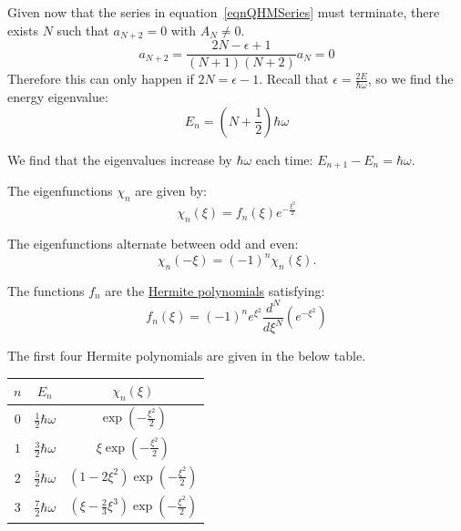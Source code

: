 \documentclass[../Main.tex]{subfiles}
\begin{document}
Given now that the series in equation~\ref{eqnQHMSeries} must terminate, there exists $N$ such that $a_{N + 2} = 0$ with $A_N \neq 0$.
\begin{equation*}
    a_{N+2} = \frac{2N - \epsilon + 1}{(N+1)(N+2)} a_N = 0
\end{equation*}
Therefore this can only happen if $2N = \epsilon - 1$. Recall that $\epsilon = \frac{2E}{\hbar \omega}$, so we find the energy eigenvalue:
\begin{equation*}
    E_n = \left(N + \frac12\right) \hbar \omega
\end{equation*}
\begin{remarks}
    \item We find that the eigenvalues increase by $\hbar \omega$ each time: $E_{n+1} - E_n = \hbar \omega$.
    \item The eigenfunctions $\chi_n$ are given by:
        \begin{equation*}
            \chi_n(\xi) = f_n(\xi) e^{-\frac{\xi^2}{2}}
        \end{equation*}
    \item The eigenfunctions alternate between odd and even:
        \begin{equation*}
            \chi_n(-\xi) = (-1)^n \chi_n(\xi).
        \end{equation*}
    \item The functions $f_n$ are the \underline{Hermite polynomials} satisfying:
        \begin{equation*}
            f_n(\xi) = (-1)^n e^{\xi^2} \frac{d^{N}}{d\xi^{N}} \left(e^{-\xi^2}\right)
        \end{equation*}
\end{remarks}
The first four Hermite polynomials are given in the below table.

\begin{tabular}{|c|c|c|}
    \hline
    $n$ & $E_n$ & $\chi_n(\xi)$ \\
    \hline
    $0$ & $\frac12 \hbar \omega$ & $\exp\left(-\frac{\xi^2}{2}\right)$ \\
    $1$ & $\frac32 \hbar \omega$ & $\xi\exp\left(-\frac{\xi^2}{2}\right)$ \\
    $2$ & $\frac52 \hbar \omega$ & $(1 - 2\xi^2)\exp\left(-\frac{\xi^2}{2}\right)$ \\
    $3$ & $\frac72 \hbar \omega$ & $(\xi - \frac23\xi^3)\exp\left(-\frac{\xi^2}{2}\right)$ \\
    \hline
\end{tabular}
\end{document}

